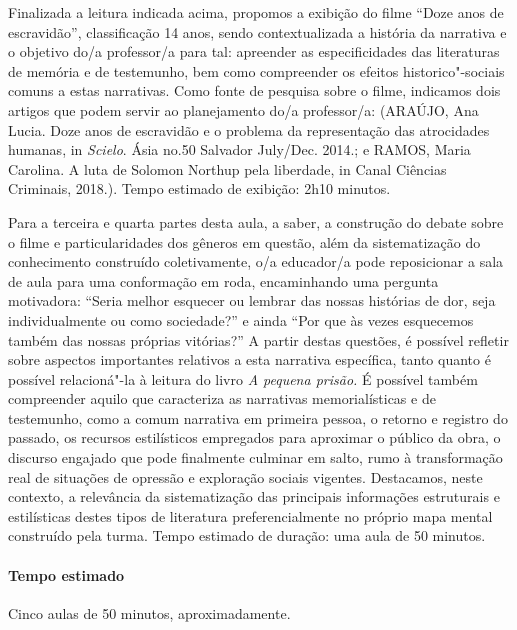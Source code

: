 \documentclass[11pt]{extarticle}
\begin{document}
Finalizada a leitura indicada acima, propomos a exibição do filme ``Doze
anos de escravidão'', classificação 14 anos, sendo contextualizada a
história da narrativa e o objetivo do/a professor/a para tal: apreender
as especificidades das literaturas de memória e de testemunho, bem como
compreender os efeitos historico"-sociais comuns a estas narrativas. Como
fonte de pesquisa sobre o filme, indicamos dois artigos que podem servir
ao planejamento do/a professor/a: (ARAÚJO, Ana Lucia. Doze anos de
escravidão e o problema da representação das atrocidades humanas, in
\emph{Scielo}. Ásia no.50 Salvador July/Dec. 2014.; e RAMOS, Maria
Carolina. A luta de Solomon Northup pela liberdade, in Canal Ciências
Criminais, 2018.). Tempo estimado de exibição: 2h10 minutos.

Para a terceira e quarta partes desta aula, a saber, a construção do
debate sobre o filme e particularidades dos gêneros em questão, além da
sistematização do conhecimento construído coletivamente, o/a educador/a
pode reposicionar a sala de aula para uma conformação em roda,
encaminhando uma pergunta motivadora: ``Seria melhor esquecer ou lembrar
das nossas histórias de dor, seja individualmente ou como sociedade?'' e
ainda ``Por que às vezes esquecemos também das nossas próprias vitórias?''
A partir destas questões, é possível refletir sobre aspectos importantes
relativos a esta narrativa específica, tanto quanto é possível
relacioná"-la à leitura do livro \emph{A pequena prisão.} É possível
também compreender aquilo que caracteriza as narrativas memorialísticas
e de testemunho, como a comum narrativa em primeira pessoa, o retorno e
registro do passado, os recursos estilísticos empregados para aproximar
o público da obra, o discurso engajado que pode finalmente culminar em
salto, rumo à transformação real de situações de opressão e exploração
sociais vigentes. Destacamos, neste contexto, a relevância da
sistematização das principais informações estruturais e estilísticas
destes tipos de literatura preferencialmente no próprio mapa mental
construído pela turma. Tempo estimado de duração: uma aula de 50
minutos.

\paragraph{Tempo estimado} Cinco aulas de 50 minutos,
aproximadamente.

\end{document}
